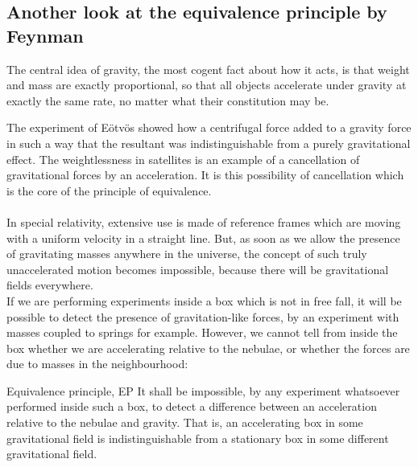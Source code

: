 \subsection{Another look at the equivalence principle by Feynman}
\begin{statements} 
	The central idea of gravity, the most cogent fact about how it acts, is that weight and mass are exactly proportional, so that all objects accelerate under gravity at exactly the same rate, no matter what their constitution may be.
\end{statements}
The experiment of Eötvös showed how a centrifugal force added to a gravity force in such a way that the resultant was indistinguishable from a purely gravitational effect. The weightlessness in satellites is an example of a cancellation of gravitational forces by an acceleration. It is this possibility of cancellation which is the core of the principle of equivalence.\\
\\
In special relativity, extensive use is made of reference frames which are moving with a uniform velocity in a straight line. But, as soon as we allow the presence of gravitating masses anywhere in the universe, the concept of such truly unaccelerated motion becomes impossible, because there will be gravitational fields everywhere.\\
If we are performing experiments inside a box which is not in free fall, it will be possible to detect the presence of gravitation-like forces, by an experiment with masses coupled to springs for example. However, we cannot tell from inside the box whether we are accelerating relative to the nebulae, or whether the forces are due to masses in the neighbourhood:
\begin{mybox}{Equivalence principle, EP}
	It shall be impossible, by any experiment whatsoever performed inside such a box, to detect a difference between an acceleration relative to the nebulae and gravity. That is, an accelerating box in some gravitational field is indistinguishable from a stationary box in some different gravitational field.
\end{mybox}
